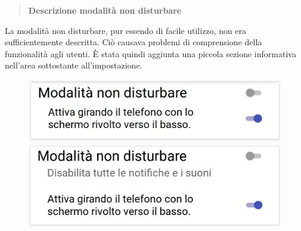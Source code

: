 \begin{quote}
	\textbf{Descrizione modalità non disturbare}
\end{quote}
La modalità non disturbare, pur essendo di facile utilizzo, non era
sufficientemente descritta.
Ciò causava problemi di comprensione della funzionalità agli utenti.  È stata
quindi aggiunta una piccola sezione informativa nell'area sottostante all'impostazione.
\begin{figure}[H]
	\begin{minipage}{.49\textwidth}
		\includegraphics[width=\textwidth]{img/modifiche/non_disturbare_old.png}
	\end{minipage}
	\begin{minipage}{.49\textwidth}
		\includegraphics[width=\textwidth]{img/modifiche/non_disturbare_new.png}
	\end{minipage}
\end{figure}
